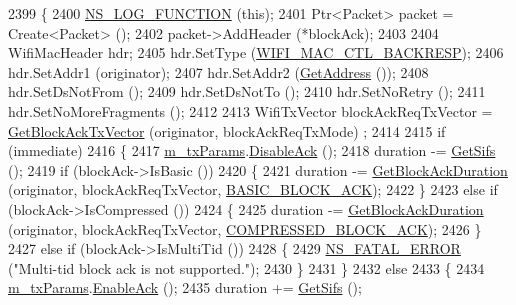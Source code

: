\begin{DoxyCode}
2399 \{
2400   \hyperlink{log-macros-disabled_8h_a90b90d5bad1f39cb1b64923ea94c0761}{NS\_LOG\_FUNCTION} (\textcolor{keyword}{this});
2401   Ptr<Packet> packet = Create<Packet> ();
2402   packet->AddHeader (*blockAck);
2403 
2404   WifiMacHeader hdr;
2405   hdr.SetType (\hyperlink{namespacens3_a9318472db39b35b2092de5c721e6ab0aaabd6e2bca4aa9279211a5e7d0c5c5afa}{WIFI\_MAC\_CTL\_BACKRESP});
2406   hdr.SetAddr1 (originator);
2407   hdr.SetAddr2 (\hyperlink{classns3_1_1MacLow_a109922d4f2bb1ee0b2a66aa3bcc48e2f}{GetAddress} ());
2408   hdr.SetDsNotFrom ();
2409   hdr.SetDsNotTo ();
2410   hdr.SetNoRetry ();
2411   hdr.SetNoMoreFragments ();
2412 
2413   WifiTxVector blockAckReqTxVector = \hyperlink{classns3_1_1MacLow_a6274c3c4a5b90a6f448cc45e89950255}{GetBlockAckTxVector} (originator, blockAckReqTxMode)
      ;
2414 
2415   \textcolor{keywordflow}{if} (immediate)
2416     \{
2417       \hyperlink{classns3_1_1MacLow_a1c5ce6a0415d4a6d394bc9fc8f78327d}{m\_txParams}.\hyperlink{classns3_1_1MacLowTransmissionParameters_ae09e5316ed859ddca19bfbaec3b07704}{DisableAck} ();
2418       duration -= \hyperlink{classns3_1_1MacLow_a9107421b7ed9f291d60b8344b4918e56}{GetSifs} ();
2419       \textcolor{keywordflow}{if} (blockAck->IsBasic ())
2420         \{
2421           duration -= \hyperlink{classns3_1_1MacLow_a53da988c70ab1519958159aea9c969c3}{GetBlockAckDuration} (originator, blockAckReqTxVector, 
      \hyperlink{namespacens3_a90f436472d19d7d7f37cbf0b8c288ff7a118b16b614e89a911b77a167632f89bf}{BASIC\_BLOCK\_ACK});
2422         \}
2423       \textcolor{keywordflow}{else} \textcolor{keywordflow}{if} (blockAck->IsCompressed ())
2424         \{
2425           duration -= \hyperlink{classns3_1_1MacLow_a53da988c70ab1519958159aea9c969c3}{GetBlockAckDuration} (originator, blockAckReqTxVector, 
      \hyperlink{namespacens3_a90f436472d19d7d7f37cbf0b8c288ff7ad325114ff6e0d84c1d4cea5bd810a48c}{COMPRESSED\_BLOCK\_ACK});
2426         \}
2427       \textcolor{keywordflow}{else} \textcolor{keywordflow}{if} (blockAck->IsMultiTid ())
2428         \{
2429           \hyperlink{group__fatal_ga5131d5e3f75d7d4cbfd706ac456fdc85}{NS\_FATAL\_ERROR} (\textcolor{stringliteral}{"Multi-tid block ack is not supported."});
2430         \}
2431     \}
2432   \textcolor{keywordflow}{else}
2433     \{
2434       \hyperlink{classns3_1_1MacLow_a1c5ce6a0415d4a6d394bc9fc8f78327d}{m\_txParams}.\hyperlink{classns3_1_1MacLowTransmissionParameters_aa2db70f6786b7d0b9d9cc453b2292f2b}{EnableAck} ();
2435       duration += \hyperlink{classns3_1_1MacLow_a9107421b7ed9f291d60b8344b4918e56}{GetSifs} ();

\end{DoxyCode}
